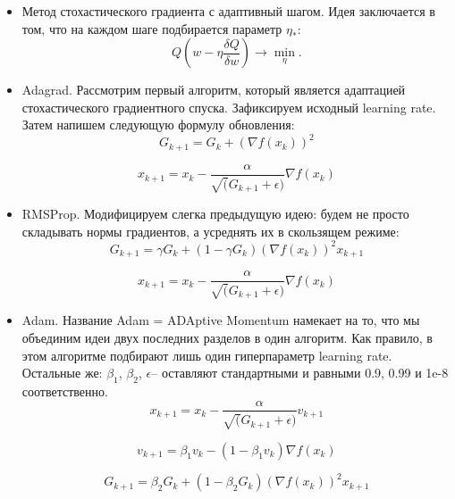 \documentclass{article}
\begin{document}
	\begin{itemize}
		\item Метод стохастического градиента с адаптивный шагом. Идея заключается в том, что на каждом шаге подбирается параметр $\eta_{*}$:
		\begin{equation*}
			Q(w - \eta \frac{\delta Q}{\delta w}) \rightarrow \min_\eta.
		\end{equation*}
	
		\item Adagrad. Рассмотрим первый алгоритм, который является адаптацией стохастического градиентного спуска. Зафиксируем исходный learning rate. Затем напишем следующую формулу обновления:
		\begin{equation*}
			G_{k+1} = G_k + (\nabla f(x_k))^2 
		\end{equation*}
	
		\begin{equation*}
			x_{k+1} = x_k - \frac{\alpha}{\sqrt(G_{k+1} + \epsilon)} \nabla f(x_k)
		\end{equation*}
	
		\item RMSProp. Модифицируем слегка предыдущую идею: будем не просто складывать нормы градиентов, а усреднять их в скользящем режиме:
		\begin{equation*}
			G_{k+1} = \gamma G_k + (1 - \gamma G_k)(\nabla f(x_k))^2 x_{k+1}
		\end{equation*}
	
		\begin{equation*}
			x_{k+1} = x_k - \frac{\alpha}{\sqrt(G_{k+1} + \epsilon)} \nabla f(x_k)
		\end{equation*}
	
		\item Adam. Название Adam = ADAptive Momentum намекает на то, что мы объединим идеи двух последних разделов в один алгоритм. Как правило, в этом алгоритме подбирают лишь один гиперпараметр learning rate. Остальные же: $\beta_1$, $\beta_2$, $\epsilon$– оставляют стандартными и равными 0.9, 0.99 и 1e-8 соответственно. 
		\begin{equation*}
			x_{k+1} = x_k - \frac{\alpha}{\sqrt(G_{k+1} + \epsilon)} v_{k+1}
		\end{equation*}
	
		\begin{equation*}
			v_{k+1} = \beta_1 v_k - (1 - \beta_1 v_k)  \nabla f(x_k)
		\end{equation*}
	
		\begin{equation*}
			G_{k+1} = \beta_2 G_k + (1 - \beta_2 G_k)(\nabla f(x_k))^2 x_{k+1}
		\end{equation*}

	\end{itemize}
 	
\end{document}
